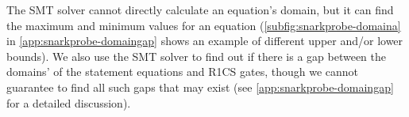  The SMT solver cannot directly calculate an equation's domain, but it can find the maximum and minimum values for an equation (\autoref{subfig:snarkprobe-domaina} in \autoref{app:snarkprobe-domaingap} shows an example of different upper and/or lower bounds). We also use the SMT solver to find out if there is a gap between the domains' of the statement equations and R1CS gates, though we cannot guarantee to find all such gaps that may exist (see \autoref{app:snarkprobe-domaingap} for a detailed discussion).



%
%
%
%
